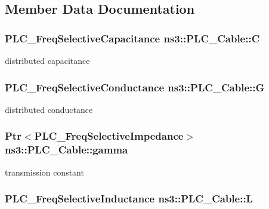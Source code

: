 \subsection{\-Member \-Data \-Documentation}
\hypertarget{classns3_1_1PLC__Cable_a2443b8723d75123547011498d535fe48}{
\subsubsection[{\-C}]{\setlength{\rightskip}{0pt plus 5cm}\-P\-L\-C\-\_\-\-Freq\-Selective\-Capacitance {\bf ns3\-::\-P\-L\-C\-\_\-\-Cable\-::\-C}}}\label{classns3_1_1PLC__Cable_a2443b8723d75123547011498d535fe48}
distributed capacitance \hypertarget{classns3_1_1PLC__Cable_af2c7882c896e9bc7f98121f7a3f25b53}{
\subsubsection[{\-G}]{\setlength{\rightskip}{0pt plus 5cm}\-P\-L\-C\-\_\-\-Freq\-Selective\-Conductance {\bf ns3\-::\-P\-L\-C\-\_\-\-Cable\-::\-G}}}\label{classns3_1_1PLC__Cable_af2c7882c896e9bc7f98121f7a3f25b53}
distributed conductance \hypertarget{classns3_1_1PLC__Cable_aef9b830c80f3a26988eebe1970e942d8}{
\subsubsection[{gamma}]{\setlength{\rightskip}{0pt plus 5cm}\-Ptr$<${\bf \-P\-L\-C\-\_\-\-Freq\-Selective\-Impedance}$>$ {\bf ns3\-::\-P\-L\-C\-\_\-\-Cable\-::gamma}}}\label{classns3_1_1PLC__Cable_aef9b830c80f3a26988eebe1970e942d8}
transmission constant \hypertarget{classns3_1_1PLC__Cable_a721d49ba4225f914d773d085c2d1f911}{
\subsubsection[{\-L}]{\setlength{\rightskip}{0pt plus 5cm}\-P\-L\-C\-\_\-\-Freq\-Selective\-Inductance {\bf ns3\-::\-P\-L\-C\-\_\-\-Cable\-::\-L}}}\label{classns3_1_1PLC__Cable_a721d49ba4225f914d773d085c2d1f911}
